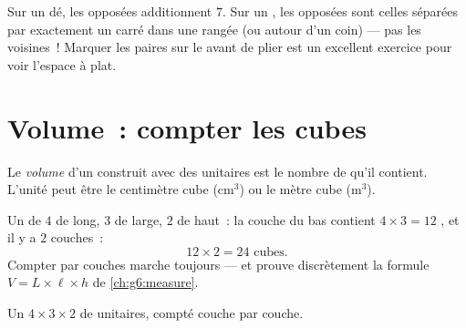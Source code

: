 \begin{example}\label{ex:g5:solids:read}
Sur un dé, les  opposées additionnent $7$. Sur un , les
 opposées sont celles séparées par exactement un carré dans
une rangée (ou autour d'un coin) --- pas les voisines~! Marquer
les paires sur le  avant de plier est un excellent exercice
pour voir l'espace à plat.
\end{example}

\section{Volume~: compter les cubes}

\begin{definition}\label{def:g5:solids:volume}
Le \emph{volume} d'un  construit avec des 
unitaires est le nombre de  qu'il contient. L'unité peut être
le centimètre cube (cm$^3$) ou le mètre cube (m$^3$).
\end{definition}

\begin{example}\label{ex:g5:solids:layers}
Un  de $4$  de long, $3$ de large, $2$ de haut~: la couche
du bas contient $4 \times 3 = 12$ , et il y a $2$ couches~:
\[
12 \times 2 = 24 \text{ cubes} .
\]
Compter par couches marche toujours --- et prouve discrètement la
formule $V = L \times \ell \times h$ de \cref{ch:g6:measure}.
\end{example}

\begin{omfigure}

{\small Un  $4 \times 3 \times 2$ de  unitaires, compté
couche par couche.}
\end{omfigure}

